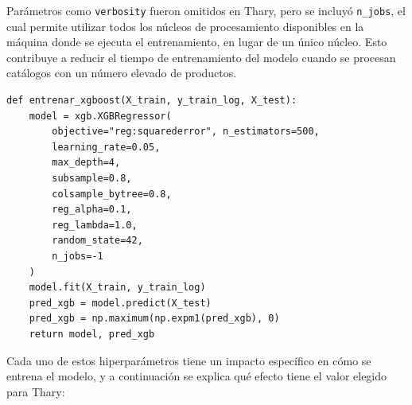 Parámetros como \texttt{verbosity} fueron omitidos en Thary, pero se incluyó \texttt{n\_jobs}, el cual permite utilizar todos los núcleos de procesamiento disponibles en la máquina donde se ejecuta el entrenamiento, en lugar de un único núcleo. Esto contribuye a reducir el tiempo de entrenamiento del modelo cuando se procesan catálogos con un número elevado de productos.

\label{lst:entrenar_xgboost}
\begin{verbatim}
def entrenar_xgboost(X_train, y_train_log, X_test):
    model = xgb.XGBRegressor(
        objective="reg:squarederror", n_estimators=500, 
        learning_rate=0.05,
        max_depth=4, 
        subsample=0.8, 
        colsample_bytree=0.8,
        reg_alpha=0.1, 
        reg_lambda=1.0, 
        random_state=42, 
        n_jobs=-1
    )
    model.fit(X_train, y_train_log)
    pred_xgb = model.predict(X_test)
    pred_xgb = np.maximum(np.expm1(pred_xgb), 0)
    return model, pred_xgb
\end{verbatim}

Cada uno de estos hiperparámetros tiene un impacto específico en cómo se entrena el modelo, y a continuación se explica qué efecto tiene el valor elegido para Thary:

